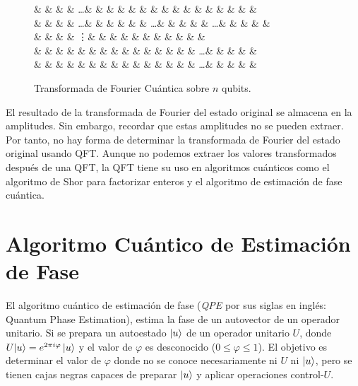 \begin{figure}[ht]
\begin{Code}
\begin{center}
\begin{quantikz}[row sep=0.3cm,column sep=0.15cm]%
 &  &  & \qw & \dots & &  &  & \qw & \qw & \qw & \qw & \qw & \qw & \qw & \qw & \qw & \qw & \qw & \qw & \qw \\
 & \qw &  & \qw & \dots & & \qw & \qw &  & \qw & \dots & &  &  & \qw & \dots & & \qw & \qw & \qw & \qw \\
\rstick{\vdots} & & & & \vdots & & & & & & & & & & & \\
 & \qw & \qw & \qw & \qw & \qw &  & \qw & \qw & \qw & \qw & \qw &  & \qw & \qw & \dots & &  &  & \qw & \qw \\
 & \qw  & \qw & \qw & \qw & \qw & \qw &  & \qw & \qw & \qw & \qw & \qw &  & \qw & \dots & & \qw &  &  & \qw \\
\end{quantikz}
\end{center}
\end{Code}
  \caption{Transformada de Fourier Cuántica sobre $n$ qubits.}
  \label{fig:quantum_fourier_circ}
\end{figure}

El resultado de la transformada de Fourier del estado original se almacena en la amplitudes. 
Sin embargo, recordar que estas amplitudes no se pueden extraer. Por tanto, no hay forma de determinar la transformada de Fourier del estado original usando QFT\@. Aunque no podemos extraer los valores transformados después de una QFT, la QFT tiene su uso en algoritmos cuánticos como el algoritmo de Shor para factorizar enteros y el algoritmo de estimación de fase cuántica.
\newpage

\section{Algoritmo Cuántico de Estimación de Fase}
El algoritmo cuántico de estimación de fase (\emph{QPE} por sus siglas en inglés: Quantum Phase Estimation), estima la fase de un autovector de un operador unitario. Si se prepara un autoestado  $\ket{u}$ de un operador unitario $U$, donde $U\!\ket{u} = e^{2\pi i \varphi}\ket{u}$ 
y el valor de $\varphi$ es desconocido ($0 \le \varphi \le 1$). 
El objetivo es determinar el valor de $\varphi$ 
donde no se conoce necesariamente ni $U$ ni $\ket{u}$, 
pero se tienen cajas negras capaces de preparar $\ket{u}$ 
y aplicar operaciones control-$U$.


